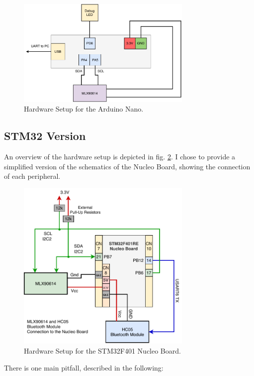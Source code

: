 \documentclass{article}[12pt]
\begin{document}
\begin{figure}[H]
  \caption{Hardware Setup for the Arduino Nano.}
  \label{fig:hwsetup}
  \centering
    \includegraphics[width=0.75\textwidth]{img/hwsetup.pdf}
\end{figure}

\subsection{STM32 Version}

An overview of the hardware setup is depicted in fig. \ref{fig:stm32hw}. I chose to provide a simplified version of the schematics of the Nucleo Board, showing the connection of each peripheral. 

\begin{figure}[H]
  \caption{Hardware Setup for the STM32F401 Nucleo Board.}
  \label{fig:stm32hw}
  \centering
    \includegraphics[width=0.75\textwidth]{img/stm32_block.pdf}
\end{figure}

There is one main pitfall, described in the following:
\end{document}
